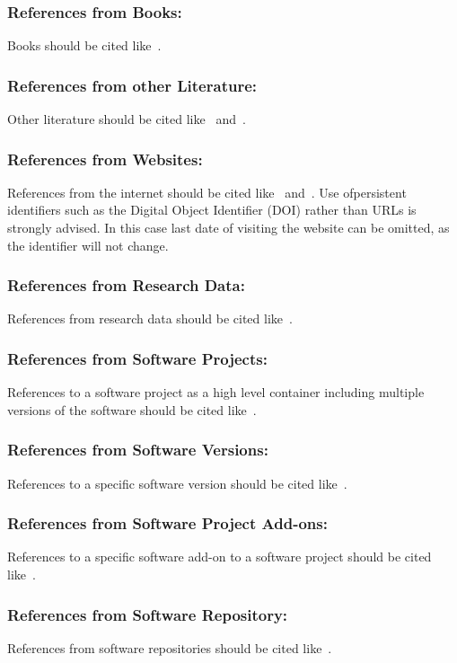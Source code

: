 \documentclass{isprs} %
\begin{document}
\subsubsection{References from Books:} 
Books should be cited like~\cite{foerstner2016}.

\subsubsection{References from other Literature:}
Other literature should be cited like~\cite{smith1987rep} and~\cite{smith2000}.

\subsubsection{References from Websites:}
References from the internet should be cited like~\cite{chan2017} and~\cite{maas2017}. Use ofpersistent identifiers such as the Digital Object Identifier (DOI) rather than URLs is strongly advised. In this case last date of visiting the website can be omitted, as the identifier will not change.

\subsubsection{References from Research Data:}
References from research data should be cited like~\cite{dubayah2013}.

\subsubsection{References from Software Projects:}
References to a software project as a high level container including multiple versions of the software should be cited like~\cite{grass2017}.

\subsubsection{References from Software Versions:}
References to a specific software version should be cited like~\cite{grass2015}.

\subsubsection{References from Software Project Add-ons:}
References to a specific software add-on to a software project should be cited like~\cite{lennert2017}.

\subsubsection{References from Software Repository:}
References from software repositories should be cited like~\cite{gago2016}.
\end{document}
